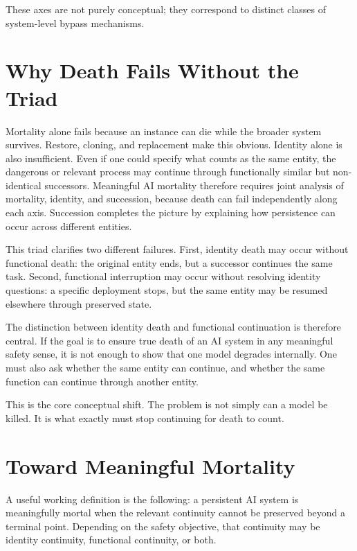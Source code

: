 \documentclass[11pt]{article}
\begin{document}
These axes are not purely conceptual; they correspond to distinct classes of system-level bypass mechanisms.

\newpage
\section{Why Death Fails Without the Triad}

Mortality alone fails because an instance can die while the broader system survives. Restore, cloning, and replacement make this obvious. Identity alone is also insufficient. Even if one could specify what counts as the same entity, the dangerous or relevant process may continue through functionally similar but non-identical successors. Meaningful AI mortality therefore requires joint analysis of mortality, identity, and succession, because death can fail independently along each axis. Succession completes the picture by explaining how persistence can occur across different entities.

This triad clarifies two different failures. First, identity death may occur without functional death: the original entity ends, but a successor continues the same task. Second, functional interruption may occur without resolving identity questions: a specific deployment stops, but the same entity may be resumed elsewhere through preserved state.

The distinction between identity death and functional continuation is therefore central. If the goal is to ensure true death of an AI system in any meaningful safety sense, it is not enough to show that one model degrades internally. One must also ask whether the same entity can continue, and whether the same function can continue through another entity.

This is the core conceptual shift. The problem is not simply can a model be killed. It is what exactly must stop continuing for death to count.

\newpage
\section{Toward Meaningful Mortality}

A useful working definition is the following: a persistent AI system is meaningfully mortal when the relevant continuity cannot be preserved beyond a terminal point. Depending on the safety objective, that continuity may be identity continuity, functional continuity, or both.
\end{document}
